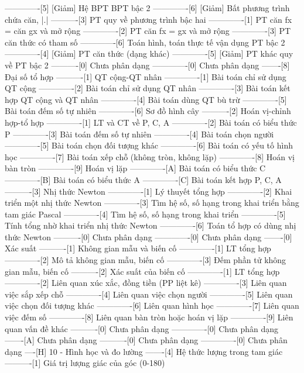 -------------[5] [Giảm] Hệ BPT BPT bậc 2
-------------[6] [Giảm] Bất phương trình chứa căn, |.|
----------[3] PT quy về phương trình bậc hai
-------------[1] PT căn fx = căn gx và mở rộng
-------------[2] PT căn fx = gx và mở rộng
-------------[3] PT căn thức có tham số
-------------[6] Toán hình, toán thực tế vận dụng PT bậc 2
-------------[4] [Giảm] PT căn thức (dạng khác)
-------------[5] [Giảm] PT khác quy về PT bậc 2
----------[0] Chưa phân dạng
-------------[0] Chưa phân dạng
-------[8] Đại số tổ hợp
----------[1] QT cộng-QT nhân
-------------[1] Bài toán chỉ sử dụng QT cộng
-------------[2] Bài toán chỉ sử dụng QT nhân
-------------[3] Bài toán kết hợp QT cộng và QT nhân
-------------[4] Bài toán dùng QT bù trừ
-------------[5] Bài toán đếm số tự nhiên
-------------[6] Sơ đồ hình cây
----------[2] Hoán vị-chỉnh hợp-tổ hợp
-------------[1] LT và CT về P, C, A
-------------[2] Bài toán có biểu thức P
-------------[3] Bài toán đếm số tự nhiên
-------------[4] Bài toán chọn người
-------------[5] Bài toán chọn đối tượng khác
-------------[6] Bài toán có yếu tố hình học
-------------[7] Bài toán xếp chỗ (không tròn, không lặp)
-------------[8] Hoán vị bàn tròn
-------------[9] Hoán vị lặp
-------------[A] Bài toán có biểu thức C
-------------[B] Bài toán có biểu thức A
-------------[C] Bài toán kết hợp P, C, A
----------[3] Nhị thức Newton
-------------[1] Lý thuyết tổng hợp 
-------------[2] Khai triển một nhị thức Newton
-------------[3] Tìm hệ số, số hạng trong khai triển bằng tam giác Pascal
-------------[4] Tìm hệ số, số hạng trong khai triển
-------------[5] Tính tổng nhờ khai triển nhị thức Newton
-------------[6] Toán tổ hợp có dùng nhị thức Newton
----------[0] Chưa phân dạng
-------------[0] Chưa phân dạng
-------[0] Xác suất
----------[1] Không gian mẫu và biến cố
-------------[1] LT tổng hợp
-------------[2] Mô tả không gian mẫu, biến cố
-------------[3] Đếm phần tử không gian mẫu, biến cố
----------[2] Xác suất của biến cố
-------------[1] LT tổng hợp
-------------[2] Liên quan xúc xắc, đồng tiền (PP liệt kê)
-------------[3] Liên quan việc sắp xếp chỗ
-------------[4] Liên quan việc chọn người
-------------[5] Liên quan việc chọn đối tượng khác
-------------[6] Liên quan hình học
-------------[7] Liên quan việc đếm số
-------------[8] Liên quan bàn tròn hoặc hoán vị lặp
-------------[9] Liên quan vấn đề khác
----------[0] Chưa phân dạng
-------------[0] Chưa phân dạng
-------[A] Chưa phân dạng
----------[0] Chưa phân dạng
-------------[0] Chưa phân dạng
----[H] 10 - Hình học và đo lường
-------[4] Hệ thức lượng trong tam giác
----------[1] Giá trị lượng giác của góc (0-180)
